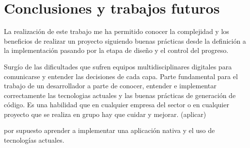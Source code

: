 \cleardoublepage
\chapter{Conclusiones y trabajos futuros}
\label{chap:conclusiones-trabajos-futuros}


La realización de este trabajo me ha permitido conocer la complejidad y los beneficios de realizar un proyecto siguiendo buenas prácticas desde la definición a la implementación pasando por la etapa de diseño y el control del progreso.

Surgío de las dificultades que sufren equipos multidisciplinares digitales para comunicarse y entender las decisiones de cada capa. Parte fundamental para el trabajo de un desarrollador a parte de conocer, entender e implementar correctamente las tecnologias actuales y las buenas prácticas de generación de código. Es una habilidad que en cualquier empresa del sector o en cualquier proyecto que se realiza en grupo hay que cuidar y mejorar. (aplicar)

por supuesto aprender a implementar una aplicación nativa y el uso de tecnologías actuales.



